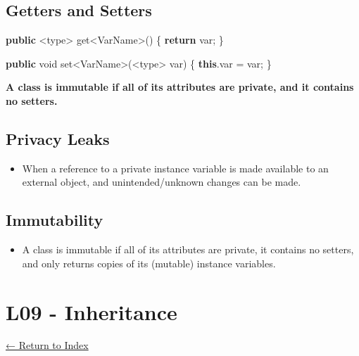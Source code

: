 \documentclass[]{article}
\newenvironment{Shaded}{}{}
\newcommand{\DataTypeTok}[1]{\textcolor[rgb]{0.56,0.13,0.00}{#1}}
\newcommand{\FunctionTok}[1]{\textcolor[rgb]{0.02,0.16,0.49}{#1}}
\newcommand{\KeywordTok}[1]{\textcolor[rgb]{0.00,0.44,0.13}{\textbf{#1}}}
\newcommand{\NormalTok}[1]{#1}
\providecommand{\tightlist}{%
  \setlength{\itemsep}{0pt}\setlength{\parskip}{0pt}}
\begin{document}
\hypertarget{getters-and-setters}{%
\subsection{Getters and Setters}\label{getters-and-setters}}

\begin{Shaded}
\begin{Highlighting}[]
\KeywordTok{public}\NormalTok{ <type> get<VarName>() \{}
    \KeywordTok{return}\NormalTok{ var;}
\NormalTok{\}}

\KeywordTok{public} \DataTypeTok{void}\NormalTok{ set<VarName>(<type> var) \{}
    \KeywordTok{this}\NormalTok{.}\FunctionTok{var}\NormalTok{ = var;}
\NormalTok{\}}
\end{Highlighting}
\end{Shaded}

\textbf{A class is immutable if all of its attributes are private, and
it contains no setters.}

\hypertarget{privacy-leaks}{%
\subsection{Privacy Leaks}\label{privacy-leaks}}

\begin{itemize}
\tightlist
\item
  When a reference to a private instance variable is made available to
  an external object, and unintended/unknown changes can be made.
\end{itemize}

\hypertarget{immutability-1}{%
\subsection{Immutability}\label{immutability-1}}

\begin{itemize}
\tightlist
\item
  A class is immutable if all of its attributes are private, it contains
  no setters, and only returns copies of its (mutable) instance
  variables.
\end{itemize}

\hypertarget{l09---inheritance}{%
\section{L09 - Inheritance}\label{l09---inheritance}}

\protect\hyperlink{table-of-contents}{← Return to Index}
\end{document}
